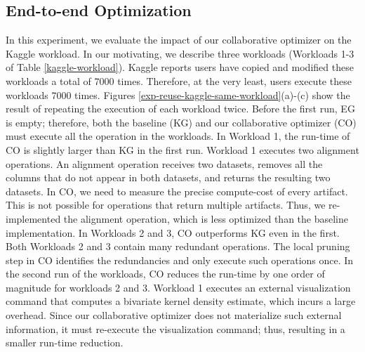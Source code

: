 \subsection{End-to-end Optimization}
In this experiment, we evaluate the impact of our collaborative optimizer on the Kaggle workload.
In our motivating, we describe three workloads (Workloads 1-3 of Table \ref{kaggle-workload}).
Kaggle reports users have copied and modified these workloads a total of 7000 times.
Therefore, at the very least, users execute these workloads 7000 times.
Figures \ref{exp-reuse-kaggle-same-workload}(a)-(c) show the result of repeating the execution of each workload twice.
Before the first run, EG is empty; therefore, both the baseline (KG) and our collaborative optimizer (CO) must execute all the operation in the workloads.
In Workload 1, the run-time of CO is slightly larger than KG in the first run.
Workload 1 executes two alignment operations.
An alignment operation receives two datasets, removes all the columns that do not appear in both datasets, and returns the resulting two datasets.
In CO, we need to measure the precise compute-cost of every artifact.
This is not possible for operations that return multiple artifacts.
Thus, we re-implemented the alignment operation, which is less optimized than the baseline implementation.
In Workloads 2 and 3, CO outperforms KG even in the first.
Both Workloads 2 and 3 contain many redundant operations.
The local pruning step in CO identifies the redundancies and only execute such operations once.
In the second run of the workloads, CO reduces the run-time by one order of magnitude for workloads 2 and 3.
Workload 1 executes an external visualization command that computes a bivariate kernel density estimate, which incurs a large overhead.
Since our collaborative optimizer does not materialize such external information, it must re-execute the visualization command; thus, resulting in a smaller run-time reduction.
